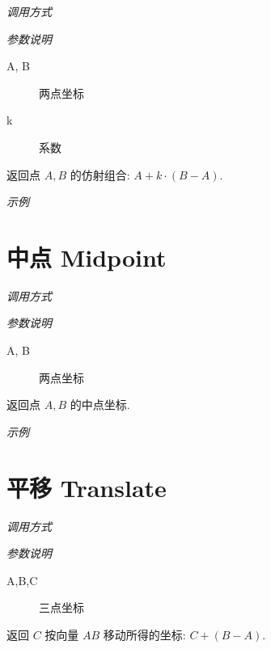 \emph{调用方式}

\begin{tcolorbox}{}
\end{tcolorbox}

\emph{参数说明}

\begin{description}
  \item[A, B] 两点坐标
  \item[k] 系数
\end{description}

返回点 $A, B$ 的仿射组合: $A + k \cdot (B-A)$.

\emph{示例}


\section{中点 Midpoint}

\emph{调用方式}

\begin{tcolorbox}{}
\end{tcolorbox}

\emph{参数说明}

\begin{description}
  \item[A, B] 两点坐标
\end{description}

返回点 $A, B$ 的中点坐标.

\emph{示例}


\section{平移 Translate}

\emph{调用方式}

\begin{tcolorbox}{}
\end{tcolorbox}

\emph{参数说明}

\begin{description}
  \item[A,B,C] 三点坐标
\end{description}

返回 $C$ 按向量 $AB$ 移动所得的坐标: $C + (B-A)$.

